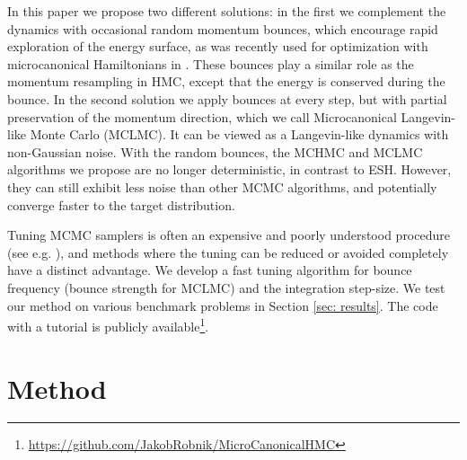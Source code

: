 \documentclass[twoside,11pt]{article}
\begin{document}
    In this paper we
    propose two different solutions: in the first we complement the dynamics with occasional  random momentum bounces, which encourage rapid exploration of the energy surface,  as was recently used for optimization with microcanonical Hamiltonians in \cite{BIoptimization}. These bounces
    play a similar role as the momentum 
    resampling in HMC, except that 
    the energy is conserved during the 
    bounce. 
    In the second
    solution we apply
    bounces at every step, but with
    partial preservation of the 
    momentum direction, which  
    we call Microcanonical 
    Langevin-like Monte Carlo (MCLMC). It can be 
    viewed as a Langevin-like dynamics 
    with non-Gaussian noise. 
    With the random 
    bounces, the MCHMC and MCLMC
    algorithms we propose 
    are no longer 
    deterministic, in contrast to ESH. However, 
    they can still exhibit less
    noise than other MCMC
    algorithms, and potentially 
    converge faster to the 
    target distribution. 

    Tuning MCMC 
    samplers is often 
    an expensive and poorly understood 
    procedure (see e.g. \citet{NUTS}), and 
    methods where the tuning can be 
    reduced or 
    avoided completely have a distinct advantage. 
    We develop a fast tuning algorithm for bounce frequency (bounce strength for MCLMC) and the integration step-size. 
    We test our method on various benchmark problems in Section \ref{sec: results}. 
The code with a tutorial is publicly available\footnote{\url{https://github.com/JakobRobnik/MicroCanonicalHMC}}.


\section{Method} \label{sec: method}
\end{document}
